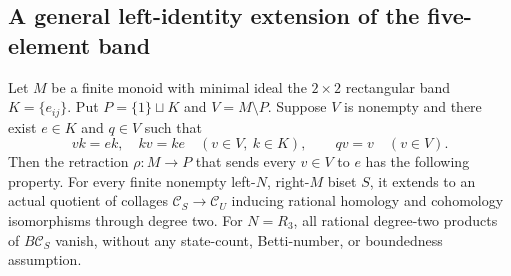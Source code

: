\subsection{A general left-identity extension of the five-element band}

\begin{theorem}
\label{CP2:A-constant-actor-left-identity-quotient}
Let $M$ be a finite monoid with minimal ideal the
$2\times2$ rectangular band $K=\{e_{ij}\}$.
Put $P=\{1\}\sqcup K$ and $V=M\setminus P$.
Suppose $V$ is nonempty and there exist $e\in K$
and $q\in V$ such that
\[
 vk=ek,\quad kv=ke\quad(v\in V,\ k\in K),
 \qquad qv=v\quad(v\in V).                                    \tag{1}
\]
Then the retraction $\rho:M\to P$ that sends every
$v\in V$ to $e$ has the following property.
For every finite nonempty left-$N$, right-$M$ biset
$S$, it extends to an actual quotient of collages
$\mathcal C_S\to\mathcal C_U$ inducing rational
homology and cohomology isomorphisms through degree two.
For $N=R_3$, all rational degree-two products of
$B\mathcal C_S$ vanish, without any state-count,
Betti-number, or boundedness assumption.
\end{theorem}
